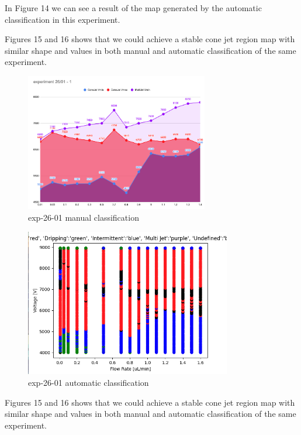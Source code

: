     In Figure 14 we can see a result of the map generated by the automatic classification in this experiment.

    Figures 15 and 16 shows that we could achieve a stable cone jet region map with similar shape and values in both manual and automatic classification of the same experiment.

    \begin{multicols}{2}


        \begin{figure}[H]
            \center
            \includegraphics[width=8cm]{Figuras/report3/manual-mapping.png}
            \caption{ exp-26-01 manual classification}
        \end{figure}

        \begin{figure}[H]
            \center
            \includegraphics[width=9cm]{Figuras/report3/map-exp-26-01.png}
            \caption{ exp-26-01 automatic classification}
        \end{figure}

    \end{multicols}

    Figures 15 and 16 shows that we could achieve a stable cone jet region map with similar shape and values in both manual and automatic classification of the same experiment.


